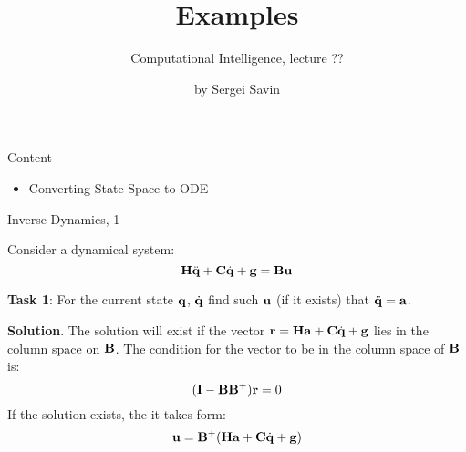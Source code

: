 \documentclass{beamer}
\title{Examples}
\subtitle{Computational Intelligence, lecture ??}
\author{by Sergei Savin}
\date{\mydate}
\begin{document}
\maketitle


\begin{frame}{Content}

\begin{itemize}
\item  Converting State-Space to ODE
\end{itemize}

\end{frame}




\begin{frame}{Inverse Dynamics, 1}
	\begin{flushleft}
		
		Consider a dynamical system:
		\begin{equation}
			\mathbf{H} \ddot{\mathbf{q}} + \mathbf{C}\dot{\mathbf{q}} + \mathbf{g} = \mathbf{B}\mathbf{u}
		\end{equation}		
		
		\textbf{Task 1}: 
		For the current state $\mathbf{q}$, $\dot{\mathbf{q}}$ find such $\mathbf{u}$ (if it exists) that $\ddot{\mathbf{q}} = \mathbf{a}$.
		
		\bigskip
		
		\textbf{Solution}. The solution will exist if the vector $\mathbf{r} = \mathbf{H} \mathbf{a} + \mathbf{C}\dot{\mathbf{q}} + \mathbf{g} $ lies in the column space on $\mathbf{B}$. The condition for the vector to be in the column space of $\mathbf{B}$ is:
		\begin{equation}
			(\mathbf{I} - \mathbf{B}\mathbf{B}^+)\mathbf{r} = 0
		\end{equation}		
		If the solution exists, the it takes form:
		\begin{equation}
			\mathbf{u} = \mathbf{B}^+ (\mathbf{H} \mathbf{a} + \mathbf{C}\dot{\mathbf{q}} + \mathbf{g} )
		\end{equation}		
		
	\end{flushleft}
\end{frame}
\end{document}

